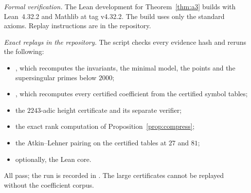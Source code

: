 \emph{Formal verification.} The Lean development for Theorem~\ref{thm:a3} builds with Lean~4.32.2 and Mathlib at tag v4.32.2. The build uses only the standard axioms. Replay instructions are in the repository.

\emph{Exact replays in the repository.} The script  checks every evidence hash and reruns the following:
\begin{itemize}[leftmargin=*]
\item {}, which recomputes the invariants, the minimal model, the points and the supersingular primes below $2000$;
\item {}, which recomputes every certified coefficient from the certified symbol tables;
\item the $2243$-adic height certificate and its separate verifier;
\item the exact rank computation of Proposition~\ref{prop:compress};
\item the Atkin--Lehner pairing on the certified tables at $27$ and $81$;
\item optionally, the Lean core.
\end{itemize}
All pass; the run is recorded in . The large certificates cannot be replayed without the coefficient corpus.
